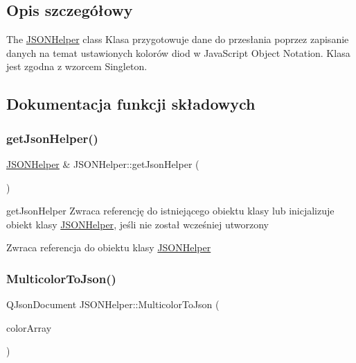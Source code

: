 \subsection{Opis szczegółowy}
The \mbox{\hyperlink{class_j_s_o_n_helper}{J\+S\+O\+N\+Helper}} class Klasa przygotowuje dane do przesłania poprzez zapisanie danych na temat ustawionych kolorów diod w Java\+Script Object Notation. Klasa jest zgodna z wzorcem Singleton. 

\subsection{Dokumentacja funkcji składowych}
\mbox{\label{class_j_s_o_n_helper_a16b59ed7de044a5f3e81cc2109d370a1}} 
\subsubsection{\texorpdfstring{get\+Json\+Helper()}{getJsonHelper()}}
{\footnotesize\ttfamily \mbox{\hyperlink{class_j_s_o_n_helper}{J\+S\+O\+N\+Helper}} \& J\+S\+O\+N\+Helper\+::get\+Json\+Helper (\begin{DoxyParamCaption}{ }\end{DoxyParamCaption})\hspace{0.3cm}{\ttfamily [static]}}



get\+Json\+Helper Zwraca referencję do istniejącego obiektu klasy lub inicjalizuje obiekt klasy \mbox{\hyperlink{class_j_s_o_n_helper}{J\+S\+O\+N\+Helper}}, jeśli nie został wcześniej utworzony 

\begin{DoxyReturn}{Zwraca}
referencja do obiektu klasy \mbox{\hyperlink{class_j_s_o_n_helper}{J\+S\+O\+N\+Helper}} 
\end{DoxyReturn}
\mbox{\label{class_j_s_o_n_helper_ab31e0865df49879496cbc07232ceb8ce}} 
\subsubsection{\texorpdfstring{Multicolor\+To\+Json()}{MulticolorToJson()}}
{\footnotesize\ttfamily Q\+Json\+Document J\+S\+O\+N\+Helper\+::\+Multicolor\+To\+Json (\begin{DoxyParamCaption}\item[{Q\+Vector$<$ Q\+String $>$}]{color\+Array }\end{DoxyParamCaption})}




